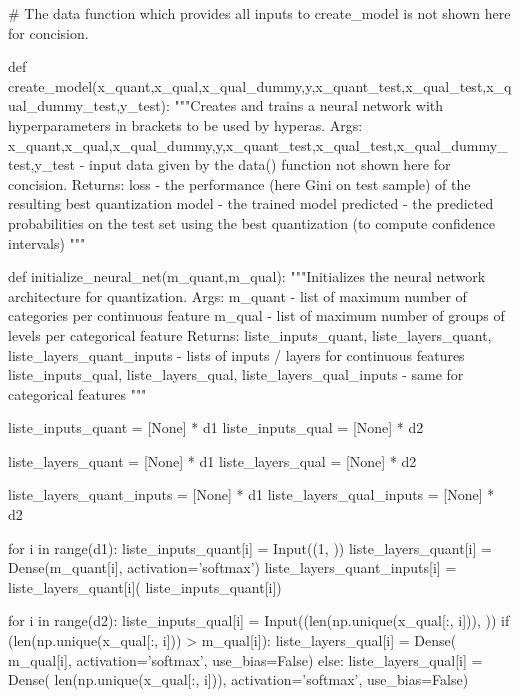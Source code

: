 \begin{pylisting}
# The data function which provides all inputs to create_model is not shown here for concision.

def create_model(x_quant,x_qual,x_qual_dummy,y,x_quant_test,x_qual_test,x_qual_dummy_test,y_test):
    """Creates and trains a neural network with hyperparameters in brackets {{}} to be used by hyperas.
    Args:
       x_quant,x_qual,x_qual_dummy,y,x_quant_test,x_qual_test,x_qual_dummy_test,y_test - input data given by the data() function not shown here for concision.
    Returns:
       loss - the performance (here Gini on test sample) of the resulting best quantization
       model - the trained model
       predicted - the predicted probabilities on the test set using the best quantization (to compute confidence intervals)
    """
    
    def initialize_neural_net(m_quant,m_qual):
        """Initializes the neural network architecture for quantization.
	    Args:
	       m_quant - list of maximum number of categories per continuous feature
	       m_qual - list of maximum number of groups of levels per categorical feature
	    Returns:
            liste_inputs_quant, liste_layers_quant, liste_layers_quant_inputs - lists of inputs / layers for continuous features
            liste_inputs_qual, liste_layers_qual, liste_layers_qual_inputs - same for categorical features
	    """
	    
        liste_inputs_quant = [None] * d1
        liste_inputs_qual = [None] * d2

        liste_layers_quant = [None] * d1
        liste_layers_qual = [None] * d2

        liste_layers_quant_inputs = [None] * d1
        liste_layers_qual_inputs = [None] * d2

        for i in range(d1):
            liste_inputs_quant[i] = Input((1, ))
            liste_layers_quant[i] = Dense(m_quant[i], activation='softmax')
            liste_layers_quant_inputs[i] = liste_layers_quant[i](
                liste_inputs_quant[i])

        for i in range(d2):
            liste_inputs_qual[i] = Input((len(np.unique(x_qual[:, i])), ))
            if (len(np.unique(x_qual[:, i])) > m_qual[i]):
                liste_layers_qual[i] = Dense(
                m_qual[i], activation='softmax', use_bias=False)
            else:
                liste_layers_qual[i] = Dense(
                len(np.unique(x_qual[:, i])), activation='softmax', use_bias=False)


\end{pylisting}
